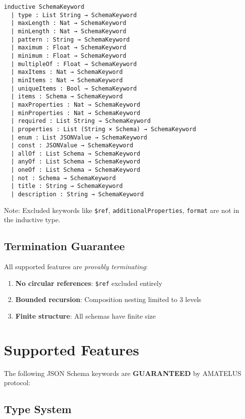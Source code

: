 \begin{verbatim}
inductive SchemaKeyword
  | type : List String → SchemaKeyword
  | maxLength : Nat → SchemaKeyword
  | minLength : Nat → SchemaKeyword
  | pattern : String → SchemaKeyword
  | maximum : Float → SchemaKeyword
  | minimum : Float → SchemaKeyword
  | multipleOf : Float → SchemaKeyword
  | maxItems : Nat → SchemaKeyword
  | minItems : Nat → SchemaKeyword
  | uniqueItems : Bool → SchemaKeyword
  | items : Schema → SchemaKeyword
  | maxProperties : Nat → SchemaKeyword
  | minProperties : Nat → SchemaKeyword
  | required : List String → SchemaKeyword
  | properties : List (String × Schema) → SchemaKeyword
  | enum : List JSONValue → SchemaKeyword
  | const : JSONValue → SchemaKeyword
  | allOf : List Schema → SchemaKeyword
  | anyOf : List Schema → SchemaKeyword
  | oneOf : List Schema → SchemaKeyword
  | not : Schema → SchemaKeyword
  | title : String → SchemaKeyword
  | description : String → SchemaKeyword
\end{verbatim}

Note: Excluded keywords like \texttt{\$ref}, \texttt{additionalProperties}, \texttt{format} are not in the inductive type.

\subsection{Termination Guarantee}

All supported features are \emph{provably terminating}:

\begin{enumerate}
  \item \textbf{No circular references}: \texttt{\$ref} excluded entirely
  \item \textbf{Bounded recursion}: Composition nesting limited to 3 levels
  \item \textbf{Finite structure}: All schemas have finite size
\end{enumerate}

\section{Supported Features}

The following JSON Schema keywords are \textbf{GUARANTEED} by AMATELUS protocol:

\subsection{Type System}

